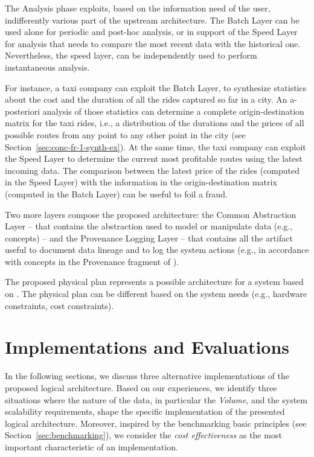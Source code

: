 {The Analysis phase exploits, based on the information need of the user, indifferently various part of the upstream architecture. The Batch Layer can be used alone for periodic and post-hoc analysis, or in support of the Speed Layer for analysis that needs to compare the most recent data with the historical one. Nevertheless, the speed layer, can be independently used to perform instantaneous analysis.

For instance, a taxi company can exploit the Batch Layer, to synthesize statistics about the cost and the duration of all the rides captured so far in a city. An a-posteriori analysis of those statistics can determine a complete origin-destination matrix for the taxi rides, i.e., a distribution of the durations and the prices of all possible routes from any point to any other point in the city (see Section~\ref{sec:conc-fr-1-synth-ex}). At the same time, the taxi company can exploit the Speed Layer to determine the current most profitable routes using the latest incoming data. The comparison between the latest price of the rides (computed in the Speed Layer) with the information in the origin-destination matrix (computed in the Batch Layer) can be useful to foil a fraud.  

Two more layers compose the proposed architecture: the Common Abstraction Layer -- that contains the abstraction used to model or manipulate data (e.g., \frappe{} concepts) -- and the Provenance Logging Layer -- that contains all the artifact useful to document data lineage and to log the system actions (e.g., in accordance with concepts in the Provenance fragment of \frappe{}).

The proposed physical plan represents a possible architecture for a system based on \river{}. The physical plan can be different based on the system needs (e.g., hardware constraints, cost constraints). 

}

\section{Implementations and Evaluations} \label{sec:comp-mod-impl}
In the following sections, we discuss three alternative implementations of the proposed logical architecture.
Based on our experiences, we identify three situations where the nature of the data, in particular the \textit{Volume}, and the system scalability requirements, shape the specific implementation of the presented logical architecture.
Moreover, inspired by the benchmarking basic principles (see Section~\ref{sec:benchmarking}), we consider the \textit{cost effectiveness} as the most important characteristic of an implementation.


